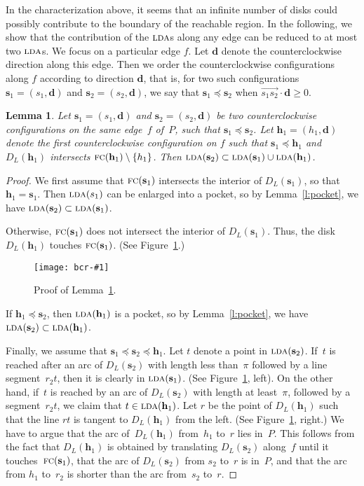 \documentclass[a4paper]{article}
\newcommand{\vecs}{{\mathbf{s}}}
\newcommand{\dir}{{\mathbf{d}}}
\newcommand{\vech}{{\mathbf{h}}}
\newcommand{\ldisk}{{D_L}}
\newcommand{\before}{\preccurlyeq}
\DeclareMathOperator{\LDA}{\textsc{lda}}
\DeclareMathOperator{\FC}{\textsc{fc}}
\let\geq\geqslant
\newtheorem{lemma}[theorem]{Lemma}
\newcommand{\epsfigure}[2]{
  \begin{figure}[htb]
    \centerline{\texttt{[image: bcr-\#1]}}
    \caption{#2}
    \label{f:#1}
  \end{figure}}
\begin{document}
In the characterization above, it seems that an infinite number of disks
could possibly contribute to the boundary of the reachable region. In the 
following, we show that the contribution of the $\LDA$s along any edge 
can be reduced to at most two $\LDA$s. We focus
on a particular edge $f$. Let $\dir$ denote the counterclockwise direction
along this edge. Then we order the counterclockwise configurations along
$f$ according to direction $\dir$, that is, for two such configurations
$\vecs_1=(s_1,\dir)$ and $\vecs_2=(s_2,\dir)$, we say that 
$\vecs_1 \before \vecs_2$ when
$\overrightarrow{s_1s_2} \cdot \dir \geq 0$.

\begin{lemma}
  \label{l:twoconf}
  Let $\vecs_1=(s_1,\dir)$ and $\vecs_2=(s_2,\dir)$ be two
  counterclockwise configurations on the same edge~$f$ of~$P$, such
  that $\vecs_1 \before \vecs_2$. Let $\vech_1=(h_1,\dir)$ denote the
  first counterclockwise configuration on $f$ such that $\vecs_1 \before
  \vech_1$ and $\ldisk(\vech_1)$ intersects $\FC(\vech_1)\setminus
  \{h_1\}$. Then $\LDA(\vecs_2) \subset \LDA(\vecs_1) \cup
  \LDA(\vech_1)$.
\end{lemma}
\begin{proof}
  We first assume that $\FC(\vecs_1)$ intersects the interior of
  $\ldisk(\vecs_1)$, so that $\vech_1=\vecs_1$. Then $\LDA(s_1)$ can
  be enlarged into a pocket, so by Lemma~\ref{l:pocket}, we have
  $\LDA(\vecs_2)\subset \LDA(\vecs_1)$.
  
  Otherwise, $\FC(\vecs_1)$ does not intersect the interior
  of $\ldisk(\vecs_1)$. Thus, the disk $\ldisk(\vech_1)$ touches
  $\FC(\vecs_1)$. (See Figure~\ref{f:com2}.) 
\epsfigure{com2}{Proof of Lemma~\ref{l:twoconf}.}
If $\vech_1 \before \vecs_2$,
  then $\LDA(\vech_1)$ is a pocket, so by Lemma~\ref{l:pocket}, we have
  $\LDA(\vecs_2) \subset \LDA(\vech_1)$. 

  Finally, we assume that $\vecs_1 \before \vecs_2 \before \vech_1$.
  Let $t$ denote a point in $\LDA(\vecs_2)$.  If~$t$ is reached after
  an arc of $\ldisk(\vecs_2)$ with length less than~$\pi$ followed by
  a line segment~$r_2t$, then it is clearly in $\LDA(\vecs_1)$. (See
  Figure~\ref{f:com2}, left).  On the other hand, if~$t$ is reached by
  an arc of $\ldisk(\vecs_2)$ with length at least~$\pi$, followed by
  a segment~$r_2t$, we claim that $t \in \LDA(\vech_1)$. Let $r$ be
  the point of $\ldisk(\vech_1)$ such that the line $rt$ is tangent to
  $\ldisk(\vech_1)$ from the left.  (See Figure~\ref{f:com2}, right.)
  We have to argue that the arc of~$\ldisk(\vech_1)$ from~$h_1$ to~$r$
  lies in~$P$. This follows from the fact that $\ldisk(\vech_1)$ is
  obtained by translating $\ldisk(\vecs_2)$ along~$f$ until it
  touches~$\FC(\vecs_1)$, that the arc of $\ldisk(\vecs_2)$ from $s_2$
  to~$r$ is in~$P$, and that the arc from $h_{1}$ to~$r_{2}$ is
  shorter than the arc from~$s_2$ to~$r$.
\end{proof}
\end{document}
